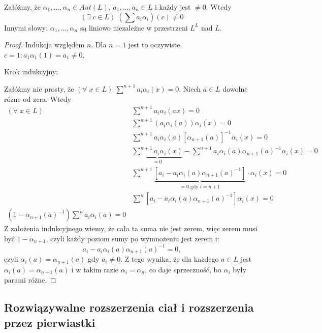 \begin{theorem}
Załóżmy, że $\alpha_1,...,\alpha_n\in Aut(L)$, $a_1,...,a_n\in L$ i każdy jest $\neq0$. Wtedy 
$$(\exists\;c\in L)\;(\sum a_i\alpha_i)(c)\neq 0$$
Innymi słowy: $\alpha_1,...,\alpha_n$ są liniowo niezależne w przestrzeni $L^L$ nad $L$.
\end{theorem}
\begin{proof}
Indukcja względem $n$. Dla $n=1$ jest to oczywiste. $c=1:a_1\alpha_1(1)=a_1\neq 0$.

Krok indukcyjny:

Załóżmy nie prosty, że $(\forall\;x\in L)\;\sum^{n+1}a_i\alpha_i(x)=0$. Niech $a\in L$ dowolne różne od zera. Wtedy
\begin{align*}
(\forall\;x\in L)\;&\sum^{n+1}a_i\alpha_i(ax)=0\\
&\sum^{n+1}(a_i\alpha_i(a))\alpha_i(x)=0\\
&\sum^{n+1}a_i\alpha_i(a)[\alpha_{n+1}(a)]^{-1}\alpha_i(x)=0\\
&\underbrace{\sum^{n+1}a_i\alpha_i(x)}_{=0}-\sum^{n+1}a_i\alpha_i(a)\alpha_{n+1}(a)^{-1}\alpha_i(x)=0\\
&\sum^{n+1}\underbrace{\left[a_i-a_i\alpha_i(a)\alpha_{n+1}(a)^{-1}\right]}_{=0\text{ gdy }i=n+1}\cdot\alpha_i(x)=0\\
&\sum^n\left[a_i-a_i\alpha_i(a)\alpha_{n+1}(a)^{-1}\right]\alpha_i(x)=0\\
(1-\alpha_{n+1}(a)^{-1})\sum^n a_i\alpha_i(a)=0
\end{align*}
Z założenia indukcyjnego wiemy, że cała ta suma nie jest zerem, więc zerem musi być $1-\alpha_{n+1}$, czyli każdy poziom sumy po wymnożeniu jest zerem i:
$$a_i-a_i\alpha_i(a)\alpha_{n+1}(a)^{-1}=0,$$
czyli $\alpha_i(a)=\alpha_{n+1}(a)$ gdy $a_i\neq 0$. Z tego wynika, że dla każdego $a\in L$ jest $\alpha_i(a)=\alpha_{n+1}(a)$ i w takim razie $\alpha_i=\alpha_n$, co daje sprzeczność, bo $\alpha_i$ były parami różne.
\end{proof}

\subsection{Rozwiązywalne rozszerzenia ciał i rozszerzenia przez pierwiastki}

